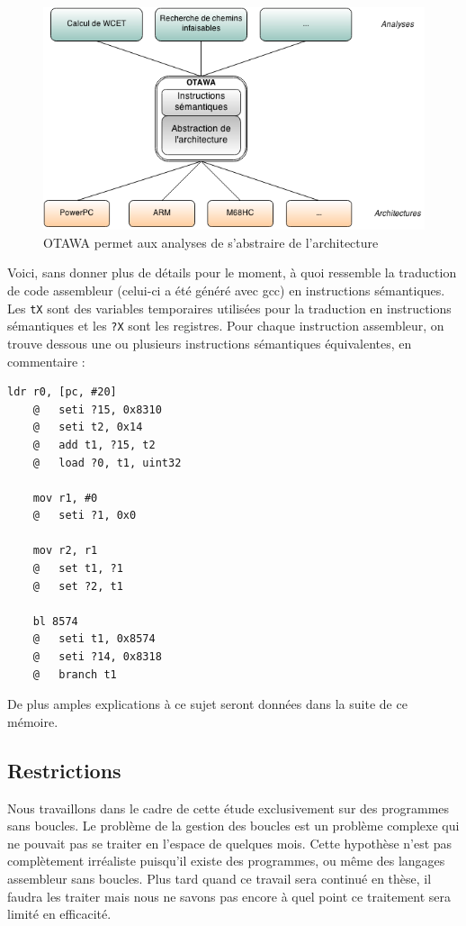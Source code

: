 \documentclass[french]{article}
\begin{document}
  \begin{figure}
    \centering
    \includegraphics[width=\textwidth]{pictures/otawa_abstraction_architecture.png}
    \caption{OTAWA permet aux analyses de s'abstraire de l'architecture}
    \label{abstraction architecture}
  \end{figure}
  
  Voici, sans donner plus de détails pour le moment, à quoi ressemble la traduction de code assembleur (celui-ci a été généré avec gcc) en instructions sémantiques. Les \texttt{tX} sont des variables temporaires utilisées pour la traduction en instructions sémantiques et les \texttt{?X} sont les registres. Pour chaque instruction assembleur, on trouve dessous une ou plusieurs instructions sémantiques équivalentes, en commentaire :
  
  \begin{lstlisting}[language={[ARM]Assembler}]
    ldr r0, [pc, #20]
    @	seti ?15, 0x8310
    @	seti t2, 0x14
    @	add t1, ?15, t2
    @	load ?0, t1, uint32
    
    mov r1, #0
    @	seti ?1, 0x0
    
    mov r2, r1
    @	set t1, ?1
    @	set ?2, t1
    
    bl 8574
    @	seti t1, 0x8574
    @	seti ?14, 0x8318
    @	branch t1
  \end{lstlisting}
  
  De plus amples explications à ce sujet seront données dans la suite de ce mémoire.
  
  \subsection{Restrictions}
  Nous travaillons dans le cadre de cette étude exclusivement sur des programmes sans boucles. Le problème de la gestion des boucles est un problème complexe qui ne pouvait pas se traiter en l'espace de quelques mois. Cette hypothèse n'est pas complètement irréaliste puisqu'il existe des programmes, ou même des langages assembleur sans boucles. Plus tard quand ce travail sera continué en thèse, il faudra les traiter mais nous ne savons pas encore à quel point ce traitement sera limité en efficacité.
  
\end{document}

